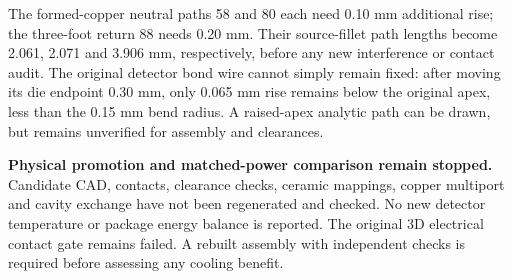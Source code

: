 The formed-copper neutral paths 58 and 80 each need 0.10 mm additional rise; the three-foot return 88 needs 0.20 mm. Their source-fillet path lengths become 2.061, 2.071 and 3.906 mm, respectively, before any new interference or contact audit. The original detector bond wire cannot simply remain fixed: after moving its die endpoint 0.30 mm, only 0.065 mm rise remains below the original apex, less than the 0.15 mm bend radius. A raised-apex analytic path can be drawn, but remains unverified for assembly and clearances.

\textbf{Physical promotion and matched-power comparison remain stopped.} Candidate CAD, contacts, clearance checks, ceramic mappings, copper multiport and cavity exchange have not been regenerated and checked. No new detector temperature or package energy balance is reported. The original 3D electrical contact gate remains failed. A rebuilt assembly with independent checks is required before assessing any cooling benefit.
